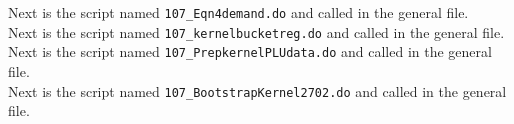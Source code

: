 

\newpage
Next is the script named \verb|107_Eqn4demand.do| and called in the general file.\\


 
 \newpage
Next is the script named \verb|107_kernelbucketreg.do| and called in the general file.\\



\newpage
Next is the script named \verb|107_PrepkernelPLUdata.do| and called in the general file.\\



\newpage
Next is the script named \verb|107_BootstrapKernel2702.do| and called in the general file.\\

 
 